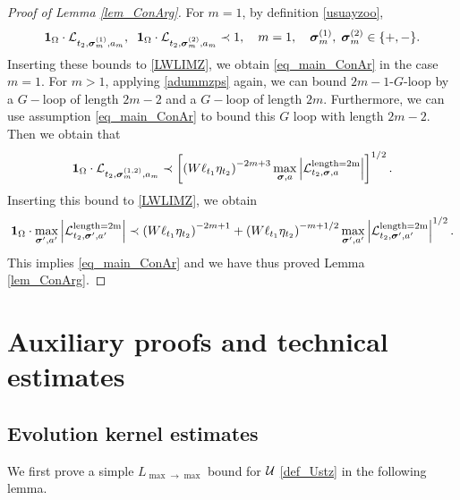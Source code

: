 \documentclass[10pt,reqno]{article}
\theoremstyle{plain} %
\theoremstyle{remark}
\numberwithin{equation}{section}
\begin{document}
\begin{proof}[Proof of Lemma \ref{lem_ConArg}]
For  $m=1$, by definition \eqref{usuayzoo}, 
\[
      {\bf 1}_{\Omega}\cdot  \mathcal{L}_{t_2, \boldsymbol{\sigma}_m^{(1)}, \textbf{a}_m},\; \;
         {\bf 1}_{\Omega}\cdot \mathcal{L}_{t_2, \boldsymbol{\sigma}_m^{(2)}, \textbf{a}_m}
    \prec 1, \quad m=1,\quad \boldsymbol{\sigma}_m^{(1)}, \;\boldsymbol{\sigma}_m^{(2)}\in\{+,-\}.
\]
Inserting  these bounds  to \eqref{LWLIMZ}, we obtain \eqref{eq_main_ConAr} in the case $m=1$.  
For $m>1$,  applying \eqref{adummzps} again,  we can bound $2m-1$-$G$-loop by a $G-$loop of length $2m-2$ and a $G-$loop of length $2m$. Furthermore, we can use assumption \eqref{eq_main_ConAr} to  bound this  $G$ loop with length $2m-2$. Then we obtain that 
$$
   {\bf 1}_{\Omega}\cdot  \mathcal{L}_{t_2, \boldsymbol{\sigma}_m^{(1,2)}, \textbf{a}_m} \prec \left[ \left( W \ell_{t_1} \eta_{t_2} \right)^{-2m+3} \max_{\boldsymbol{\sigma} , \textbf{a} } \left| \mathcal{L}^{\text{length=2m}}_{t_2, \boldsymbol{\sigma} , \textbf{a} } \right| \right]^{1/2}.
    $$
Inserting  this bound to \eqref{LWLIMZ}, we obtain 
$$
      {\bf 1}_{\Omega}\cdot\max_{\boldsymbol{\sigma}' , \textbf{a}' } \left| \mathcal{L}^{\text{length=2m}}_{t_2, \boldsymbol{\sigma}' , \textbf{a}' } \right|
    \prec \left( W \ell_{t_1} \eta_{t_2} \right)^{-2m+1 } 
    +\left( W \ell_{t_1} \eta_{t_2} \right)^{-m+1/2}
     \max_{\boldsymbol{\sigma}' , \textbf{a}' } \left| \mathcal{L}^{\text{length=2m}}_{t_2, \boldsymbol{\sigma}' , \textbf{a}' } \right|^{1/2}. 
$$
This  implies  \eqref{eq_main_ConAr} and we have thus proved  Lemma \ref{lem_ConArg}.
\end{proof}
 

\section{Auxiliary proofs and technical estimates}

\subsection{Evolution kernel estimates}\label{ks}

We first prove a simple $L_{\max\to \max}$ bound  for $\cal U$ \ref{def_Ustz} in the following lemma. 
\end{document}
